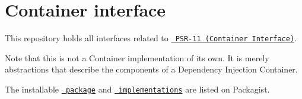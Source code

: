 \chapter{Container interface}
\hypertarget{md_public_2glpi_2vendor_2psr_2container_2_r_e_a_d_m_e}{}\label{md_public_2glpi_2vendor_2psr_2container_2_r_e_a_d_m_e}
This repository holds all interfaces related to \href{https://www.php-fig.org/psr/psr-11/}{\texttt{ PSR-\/11 (Container Interface)}}.

Note that this is not a Container implementation of its own. It is merely abstractions that describe the components of a Dependency Injection Container.

The installable \href{https://packagist.org/packages/psr/container}{\texttt{ package}} and \href{https://packagist.org/providers/psr/container-implementation}{\texttt{ implementations}} are listed on Packagist. 